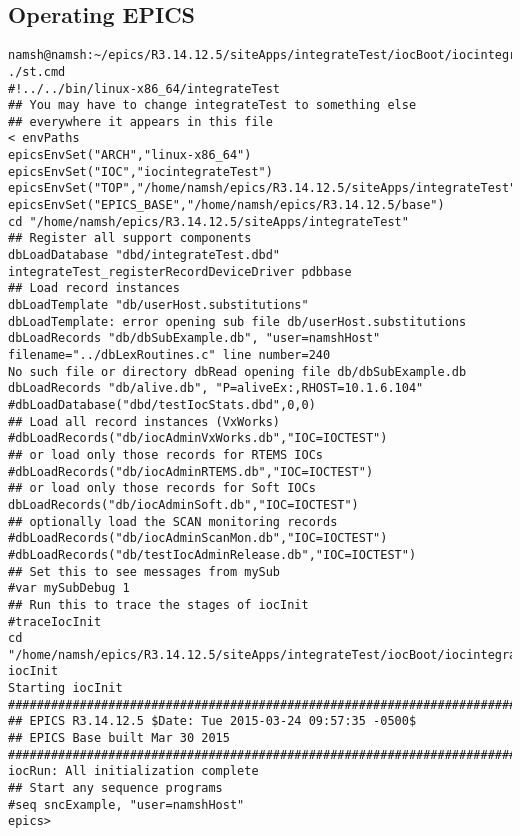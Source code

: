 \documentclass[11pt
  , a4paper
  , article
  , oneside
]{memoir}
\begin{document}
\subsection{Operating EPICS}
\begin{lstlisting}[style=termstyle]
namsh@namsh:~/epics/R3.14.12.5/siteApps/integrateTest/iocBoot/iocintegrateTest$ ./st.cmd 
#!../../bin/linux-x86_64/integrateTest
## You may have to change integrateTest to something else
## everywhere it appears in this file
< envPaths
epicsEnvSet("ARCH","linux-x86_64")
epicsEnvSet("IOC","iocintegrateTest")
epicsEnvSet("TOP","/home/namsh/epics/R3.14.12.5/siteApps/integrateTest")
epicsEnvSet("EPICS_BASE","/home/namsh/epics/R3.14.12.5/base")
cd "/home/namsh/epics/R3.14.12.5/siteApps/integrateTest"
## Register all support components
dbLoadDatabase "dbd/integrateTest.dbd"
integrateTest_registerRecordDeviceDriver pdbbase
## Load record instances
dbLoadTemplate "db/userHost.substitutions"
dbLoadTemplate: error opening sub file db/userHost.substitutions
dbLoadRecords "db/dbSubExample.db", "user=namshHost"
filename="../dbLexRoutines.c" line number=240
No such file or directory dbRead opening file db/dbSubExample.db
dbLoadRecords "db/alive.db", "P=aliveEx:,RHOST=10.1.6.104"
#dbLoadDatabase("dbd/testIocStats.dbd",0,0)
## Load all record instances (VxWorks)
#dbLoadRecords("db/iocAdminVxWorks.db","IOC=IOCTEST")
## or load only those records for RTEMS IOCs
#dbLoadRecords("db/iocAdminRTEMS.db","IOC=IOCTEST")
## or load only those records for Soft IOCs
dbLoadRecords("db/iocAdminSoft.db","IOC=IOCTEST")
## optionally load the SCAN monitoring records
#dbLoadRecords("db/iocAdminScanMon.db","IOC=IOCTEST")
#dbLoadRecords("db/testIocAdminRelease.db","IOC=IOCTEST")
## Set this to see messages from mySub
#var mySubDebug 1
## Run this to trace the stages of iocInit
#traceIocInit
cd "/home/namsh/epics/R3.14.12.5/siteApps/integrateTest/iocBoot/iocintegrateTest"
iocInit
Starting iocInit
############################################################################
## EPICS R3.14.12.5 $Date: Tue 2015-03-24 09:57:35 -0500$
## EPICS Base built Mar 30 2015
############################################################################
iocRun: All initialization complete
## Start any sequence programs
#seq sncExample, "user=namshHost"
epics> 

\end{lstlisting}
\end{document}
